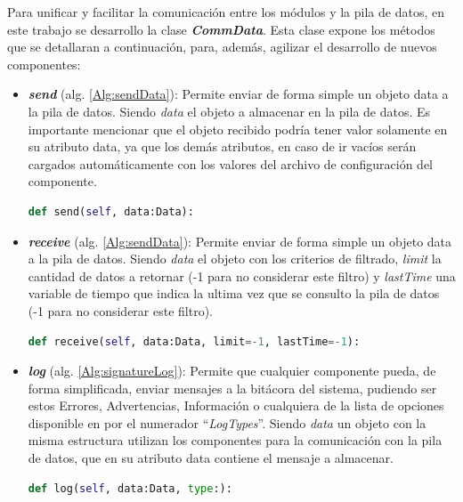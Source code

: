         Para unificar y facilitar la comunicación entre los módulos y la pila de datos, en este trabajo se desarrollo la clase \textbf{\textit{CommData}}. Esta clase expone los métodos que se detallaran a continuación, para, además, agilizar el desarrollo de nuevos componentes:
        \begin{itemize}
                \item \textbf{\textit{send}} (alg. \ref{Alg:sendData}): Permite enviar de forma simple un objeto data a la pila de datos. Siendo \textit{data} el objeto a almacenar en la pila de datos. Es importante mencionar que el objeto recibido podría tener valor solamente en su atributo data, ya que los demás atributos, en caso de ir vacíos serán cargados automáticamente con los valores del archivo de configuración del componente. 
                \begin{lstlisting}[language=Python, caption={Firma del método "\textit{sendData}" de la clase \textbf{\textit{CommPool}}.}, label=Alg:sendData, numbers=none]
def send(self, data:Data):
                \end{lstlisting}
                \item \textbf{\textit{receive}} (alg. \ref{Alg:sendData}): Permite enviar de forma simple un objeto data a la pila de datos. Siendo \textit{data} el objeto con los criterios de filtrado, \textit{limit} la cantidad de datos a retornar (-1 para no considerar este filtro) y \textit{lastTime} una variable de tiempo que indica la ultima vez que se consulto la pila de datos (-1 para no considerar este filtro).
                \begin{lstlisting}[language=Python, caption={Firma del método "\textit{receive}" de la clase \textbf{\textit{CommPool}}.}, label=Alg:receiveData, numbers=none]
def receive(self, data:Data, limit=-1, lastTime=-1):
                \end{lstlisting}
                
                \item \textbf{\textit{log}} (alg. \ref{Alg:signatureLog}): 
                Permite que cualquier componente pueda, de forma simplificada, enviar mensajes a la bitácora del sistema, pudiendo ser estos Errores, Advertencias, Información o cualquiera de la lista de opciones disponible en por el numerador ``\textit{LogTypes}''. Siendo \textit{data} un objeto con la misma estructura utilizan los componentes para la comunicación con la pila de datos, que en su atributo data contiene el mensaje a almacenar.
                \begin{lstlisting}[language=Python, caption={Firma del método "\textit{log}".}, label=Alg:signatureLog, numbers=none]
def log(self, data:Data, type:):
                \end{lstlisting}
        \end{itemize}
        
